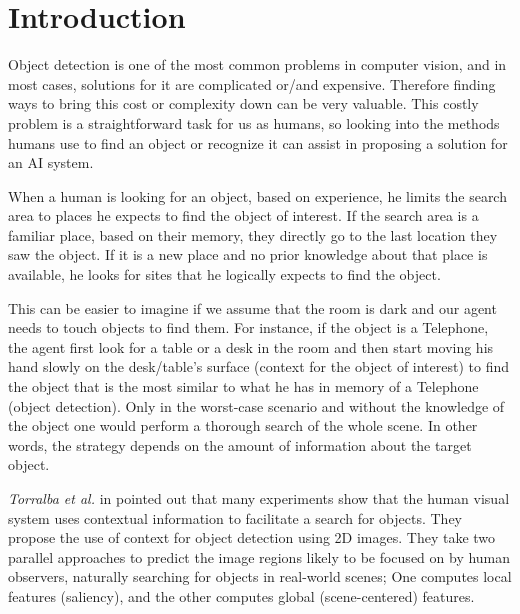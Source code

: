 \chapter{Introduction}
\label{Introduction.ch}
 Object detection is one of the most common problems in computer vision, and in
most cases, solutions for it are complicated or/and expensive. Therefore finding
ways to bring this cost or complexity down can be very valuable. This costly
problem is a straightforward task for us as humans, so looking into the methods
humans use to find an object or recognize it can assist in proposing a solution
for an AI system.
 
When a human is looking for an object, based on experience, he limits the
search area to places he expects to find the object of interest. If the search area is a familiar place, based on their memory, they directly go to the last location they saw the object. If it is a new place and no prior knowledge about that place is available, he looks for sites that he logically expects to find the object.

This can be easier to imagine if we assume that the room is dark and our
agent needs to touch objects to find them. For instance, if the object is a Telephone, the agent first look for a table or a desk in the room and then start
moving his hand slowly on the desk/table's surface (context for the object of
interest) to find the object that is the most similar to what he has in memory of
a Telephone (object detection). Only in the worst-case scenario and without the
knowledge of the object one would perform a thorough search of the whole
scene. In other words, the strategy depends on the amount of information about
the target object.



{\it Torralba et al.} in \cite{eyeMovement} pointed out that many experiments show
that the human visual system uses contextual information to facilitate a search
for objects. They propose the use of context for object detection using 2D images. They take two parallel approaches to predict the image regions likely to
be focused on by human observers, naturally searching for objects in real-world
scenes; One computes local features (saliency), and the other computes global
(scene-centered) features.

